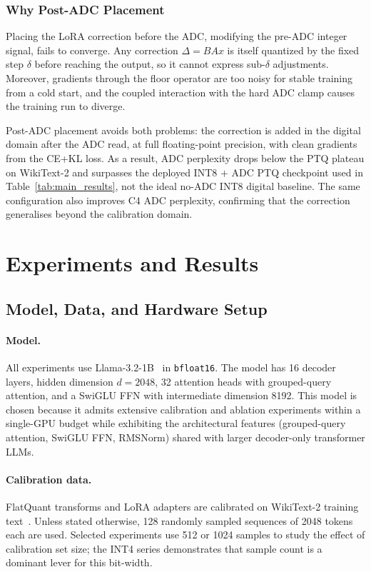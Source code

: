 \documentclass[a4paper,11pt,oneside]{article}
\theoremstyle{breakstyle}
\begin{document}
  \subsubsection{Why Post-ADC Placement}

  Placing the LoRA correction before the ADC, modifying the
  pre-ADC integer signal, fails to converge.
  Any correction $\Delta = B A x$ is itself quantized by the fixed
  step $\delta$ before reaching the output, so it cannot express
  sub-$\delta$ adjustments.
  Moreover, gradients through the floor operator are too noisy for
  stable training from a cold start, and the coupled interaction with
  the hard ADC clamp causes the training run to diverge.

  Post-ADC placement avoids both problems: the correction is added in
  the digital domain after the ADC read, at full floating-point
  precision, with clean gradients from the CE+KL loss. As a result,
  ADC perplexity drops below the PTQ plateau on WikiText-2 and
  surpasses the deployed INT8 $+$ ADC PTQ checkpoint used in
  Table~\ref{tab:main_results}, not the ideal no-ADC INT8 digital
  baseline.  The same configuration also improves C4 ADC perplexity,
  confirming that the correction generalises beyond the calibration
  domain.

  \section{Experiments and Results}\label{sec:results}\label{sec:experimental_setup}

  \subsection{Model, Data, and Hardware Setup}

  \paragraph{Model.}
  All experiments use Llama-3.2-1B~\cite{llama3} in \texttt{bfloat16}.
  The model has 16 decoder layers, hidden dimension $d = 2048$, 32
  attention heads with grouped-query attention, and a SwiGLU FFN with
  intermediate dimension 8192.
  This model is chosen because it admits extensive calibration and
  ablation experiments within a single-GPU budget while exhibiting
  the architectural features (grouped-query attention, SwiGLU FFN,
  RMSNorm) shared with larger decoder-only transformer LLMs.

  \paragraph{Calibration data.}
  FlatQuant transforms and LoRA adapters are calibrated on WikiText-2
  training text~\cite{wikitext2}.
  Unless stated otherwise, 128 randomly sampled sequences of 2048 tokens
  each are used.
  Selected experiments use 512 or 1024 samples to study the effect of
  calibration set size; the INT4 series demonstrates that sample count
  is a dominant lever for this bit-width.
\end{document}
